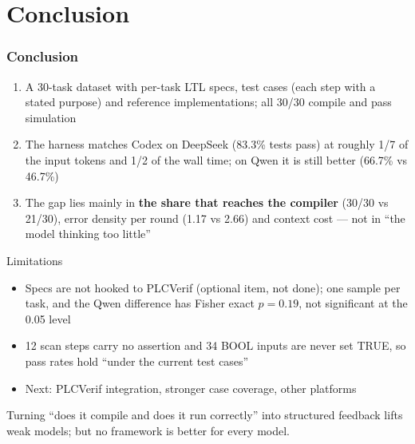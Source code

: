 \documentclass[10pt,aspectratio=169]{beamer}
\begin{document}
\section{Conclusion}

\begin{frame}
  \frametitle{Conclusion}

  \begin{enumerate}
    \item A 30-task dataset with per-task LTL specs, test cases (each step with a
          stated purpose) and reference implementations; all 30/30 compile and
          pass simulation
    \item The harness matches Codex on DeepSeek (83.3\% tests pass) at roughly
          1/7 of the input tokens and 1/2 of the wall time; on Qwen it is still
          better (66.7\% vs 46.7\%)
    \item The gap lies mainly in \textbf{the share that reaches the compiler}
          (30/30 vs 21/30), error density per round (1.17 vs 2.66) and context
          cost --- not in ``the model thinking too little''
  \end{enumerate}

  \vspace{0.2mm}
  \begin{block}{Limitations}
    \small
    \begin{itemize}
      \item Specs are not hooked to PLCVerif (optional item, not done); one
            sample per task, and the Qwen difference has Fisher exact
            $p=0.19$, not significant at the 0.05 level
      \item 12 scan steps carry no assertion and 34 BOOL inputs are never set
            TRUE, so pass rates hold ``under the current test cases''
      \item Next: PLCVerif integration, stronger case coverage, other platforms
    \end{itemize}
  \end{block}

  \vspace{0.6em}
  \begin{center}\footnotesize
    \begin{minipage}{0.92\textwidth}\centering
      Turning ``does it compile and does it run correctly'' into structured
      feedback lifts weak models; but no framework is better for every model.
    \end{minipage}
  \end{center}
\end{frame}
\end{document}

